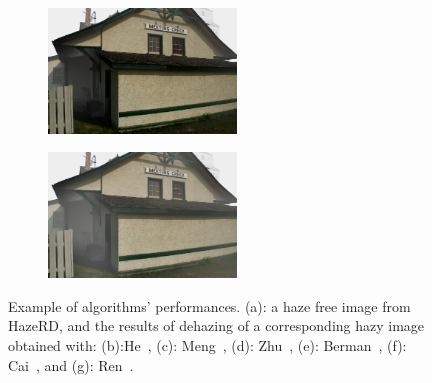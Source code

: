 \begin{figure}[htb]
\begin{subfigure}[b]{0.45\linewidth}
  \subcaption{}
\end{subfigure}
\vfill
\begin{subfigure}[b]{0.45\linewidth}
  \centering
  \centerline{\includegraphics[width=5cm]{hazerd/img/dehaze_cai}}
  \subcaption{}
\end{subfigure}
\hfill
\begin{subfigure}[b]{0.45\linewidth}
  \centering
  \centerline{\includegraphics[width=5cm]{hazerd/img/dehaze_ren}}
  \subcaption{}
\end{subfigure}
\vfill
\caption{Example of algorithms' performances. (a): a haze free image from HazeRD, and the results of dehazing of a corresponding hazy image obtained with: (b):He~\cite{he2011single}, (c): Meng~\cite{meng2013efficient}, (d): Zhu~\cite{zhu2015fast}, (e): Berman~\cite{berman2016non}, (f): Cai~\cite{cai2016dehazenet}, and (g): Ren~\cite{Ren-ECCV-2016}.}
\label{fig:3.exmaple.hazerd}
\end{figure}
